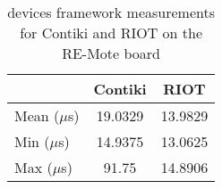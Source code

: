 \begin{table}[!ht]
  \centering
  \begin{tabular}{l|c|c}
                & Contiki  & RIOT \\ \hline
  Mean ($\mu$s) & 19.0329  & 13.9829 \\
  Min  ($\mu$s) & 14.9375  & 13.0625 \\
  Max  ($\mu$s) & 91.75    & 14.8906
  \end{tabular}
  \caption{devices framework measurements for Contiki and RIOT on the RE-Mote board}
  \label{tab:devices-framework-remote}
  \end{table}